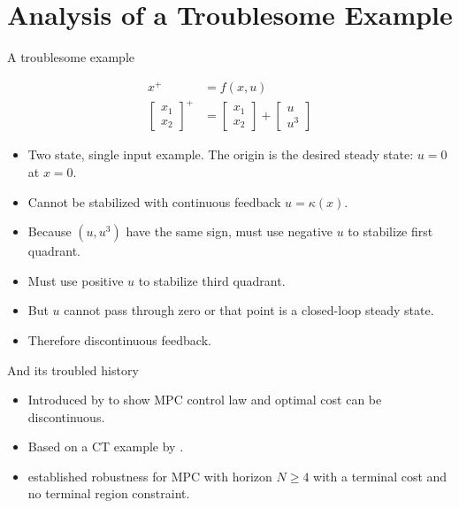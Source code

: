 \documentclass{beamer}
\begin{document}
\section{Analysis of a Troublesome Example}

\begin{frame}{A troublesome example}

\begin{align*}
x^+ &= f(x,u) \\
\begin{bmatrix}  x_1 \\ x_2 \end{bmatrix}^+ &= 
\begin{bmatrix}  x_1 \\ x_2 \end{bmatrix} + 
\begin{bmatrix}  u \\ u^3 \end{bmatrix}
\end{align*}

\begin{itemize}
\item Two state, single input example. The origin is the desired
  steady state: $u=0$ at $x=0$.
\item Cannot be stabilized with continuous feedback $u=\kappa(x)$. 

\item Because $(u,u^3)$ have the same sign, must use negative $u$ to
stabilize first quadrant. 
\item Must use positive $u$ to stabilize third
quadrant.  

\item But $u$ cannot pass through zero or that point is a closed-loop
steady state. 
\item Therefore \alert{discontinuous} feedback.
\end{itemize}
\end{frame}

\begin{frame}{And its troubled history}
\begin{itemize}
\item Introduced by \cite{meadows:henson:eaton:rawlings:1995}
  to show MPC control law and optimal cost can be discontinuous. 

\item Based on a CT example by \cite{coron:1990}.

\item \cite{grimm:messina:tuna:teel:2005} established robustness for
  MPC with horizon $N \geq 4$ with a terminal cost and no terminal region constraint.
\end{itemize}
\end{frame}
\end{document}
